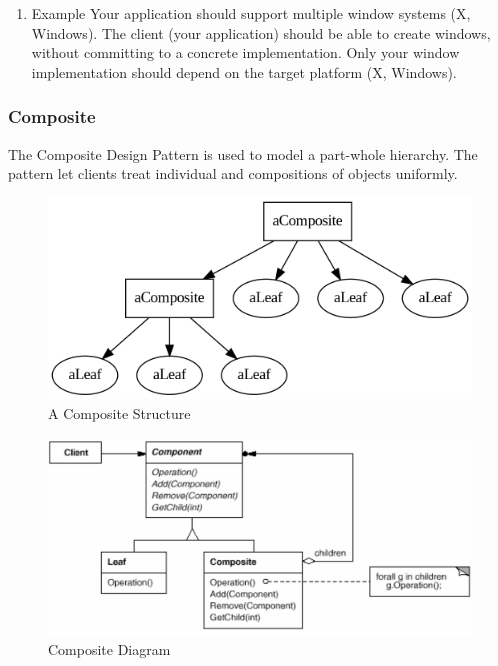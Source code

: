 \documentclass[11pt]{article}
\begin{document}
\begin{enumerate}
\item Example
\label{sec:org287d570}
Your application should support multiple window systems (X, Windows).
The client (your application) should be able to create windows, without committing to a concrete implementation.
Only your window implementation should depend on the target platform (X, Windows).
\end{enumerate}


\subsubsection{Composite}
\label{sec:orgd712b72}
The Composite Design Pattern is used to model a part-whole hierarchy.
The pattern let clients treat individual and compositions of objects uniformly.

\begin{figure}[htbp]
\centering
\includegraphics[width=.9\linewidth]{img/compsite_graph.png}
\caption{\label{fig:a-composite-structure}A Composite Structure}
\end{figure}


\begin{figure}[htbp]
\centering
\includegraphics[width=.9\linewidth]{img/composite.png}
\caption{\label{fig:composite-diagram}Composite Diagram}
\end{figure}
\end{document}
